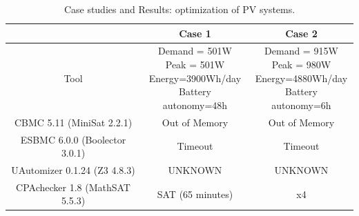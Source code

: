 \documentclass[10pt,conference]{IEEEtran}
\begin{document}
\begin{table}
\caption{Case studies and Results: optimization of PV systems.}\label{tab1}
\begin{scriptsize}
\begin{tabular}{|c|c|c|}
\hline
\hline
 & Case 1 & Case 2\\
\hline
\hline
Tool & \makecell{Demand = 501W \\ Peak = 501W \\ Energy=3900Wh/day \\ Battery autonomy=48h} & \makecell{Demand = 915W \\ Peak = 980W \\ Energy=4880Wh/day \\ Battery autonomy=6h}\\
\hline
CBMC 5.11 (MiniSat 2.2.1) & Out of Memory & Out of Memory \\
\hline
ESBMC 6.0.0 (Boolector 3.0.1) & Timeout & Timeout \\
\hline
UAutomizer 0.1.24 (Z3 4.8.3) & UNKNOWN & UNKNOWN \\
\hline
CPAchecker 1.8 (MathSAT 5.5.3) & SAT (65 minutes) & x4 \\
\hline
\hline
\end{tabular}
\end{scriptsize}
\end{table}

{}

\vspace{12pt}
\end{document}

